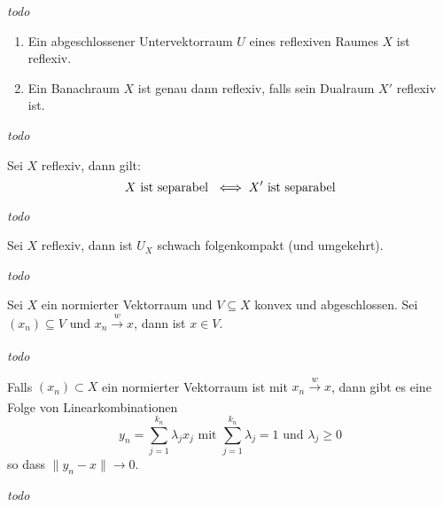 \begin{beweis}
	\textit{todo} %
\end{beweis}


\begin{prop}
	\begin{enumerate}
		\item Ein abgeschlossener Untervektorraum $U$ eines reflexiven Raumes $X$ ist reflexiv.
		\item Ein Banachraum $X$ ist genau dann reflexiv, falls sein Dualraum $X'$ reflexiv ist.
	\end{enumerate}
\end{prop}

\begin{beweis}
	\textit{todo} %
\end{beweis}


\begin{lemma}
	Sei $X$ reflexiv, dann gilt:
	\[ X \text{ ist separabel } \iff X' \text{ ist separabel} \]
\end{lemma}

\begin{beweis}
	\textit{todo} %
\end{beweis}


\begin{satz}
	Sei $X$ reflexiv, dann ist $U_{X}$ schwach folgenkompakt (und umgekehrt).
\end{satz}

\begin{beweis}
	\textit{todo} %
\end{beweis}


\begin{satz}
	Sei $X$ ein normierter Vektorraum und $V \subseteq X$ konvex und abgeschlossen. Sei $(x_{n}) \subseteq V$ und $x_{n} \xrightarrow[]{w} x$, dann ist $x \in V$.
\end{satz}

\begin{beweis}
	\textit{todo} %
\end{beweis}


\begin{kor} 
	Falls $(x_{n}) \subset X$ ein normierter Vektorraum ist mit $x_{n} \xrightarrow[]{w} x$, dann gibt es eine Folge von Linearkombinationen
	\[ y_{n} = \sum_{j = 1}^{k_{n}} \lambda_{j} x_{j} \text{ mit } \sum_{j = 1}^{k_{n}} \lambda_{j} = 1 \text{ und } \lambda_{j} \geq 0 \]
	so dass $\| y_{n} - x \| \rightarrow 0$.
\end{kor}

\begin{beweis}
	\textit{todo} %
\end{beweis}


\newpage
